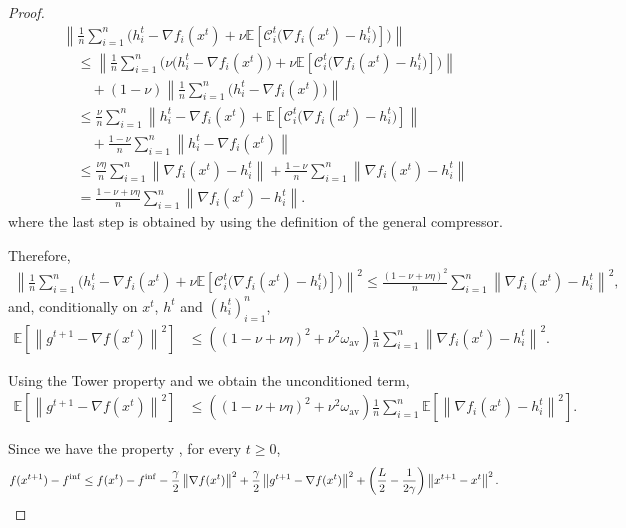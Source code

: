 \documentclass{article} %
\theoremstyle{plain}
\theoremstyle{definition}
\theoremstyle{remark}
\newcommand{\sqnorm}[1]{\left\| #1 \right\|^2}
\newcommand{\Exp}[1]{\mathbb{E}\!\left[ #1 \right]}
\newcommand{\oma}{\omega_{\mathrm{av}}}
\begin{document}
\begin{proof}
   \begin{align*}
      &\left\|\frac{1}{n}\sum_{i=1}^n \Big(h_i^{t}-\nabla f_i(x^t) +\nu \Exp{\mathcal{C}_i^t\big(\nabla f_i(x^t)-h_i^t\big)} \Big)\right\|\\
      &\quad \leq \left\|\frac{1}{n}\sum_{i=1}^n \Big(\nu\big(h_i^{t}-\nabla f_i(x^t)\big) +\nu \Exp{\mathcal{C}_i^t\big(\nabla f_i(x^t)-h_i^t\big)} \Big)\right\|\\
      &\quad\quad + (1-\nu)\left\|\frac{1}{n}\sum_{i=1}^n \big(h_i^{t}-\nabla f_i(x^t)\big)\right\|\\
      &\quad \leq \frac{\nu}{n}\sum_{i=1}^n\left\|h_i^{t}-\nabla f_i(x^t)+ \Exp{\mathcal{C}_i^t\big(\nabla f_i(x^t)-h_i^t\big)}\right\|\\
      &\quad\quad + \frac{1-\nu}{n}\sum_{i=1}^n \left\|h_i^{t}-\nabla f_i(x^t)\right\|\\
      &\quad \leq  \frac{\nu\eta}{n}\sum_{i=1}^n \left\|\nabla f_i(x^t)-h_i^{t}\right\|+ \frac{1-\nu}{n}\sum_{i=1}^n \left\|\nabla f_i(x^t)-h_i^{t}\right\|\\
      & \quad = \frac{1-\nu+\nu\eta}{n}\sum_{i=1}^n \left\|\nabla f_i(x^t)-h_i^{t}\right\|.
   \end{align*}
   where the last step is obtained by using the definition of the general compressor. 

   Therefore, 
   \begin{align*}
   \sqnorm{\frac{1}{n}\sum_{i=1}^n \Big(h_i^{t}-\nabla f_i(x^t) +\nu \Exp{\mathcal{C}_i^t\big(\nabla f_i(x^t)-h_i^t\big)} \Big)} \leq \frac{(1-\nu+\nu\eta)^2}{n}\sum_{i=1}^n \sqnorm{\nabla f_i(x^t)-h_i^{t}},
   \end{align*}
   and, 
   conditionally on $x^t$, $h^t$ and $(h_i^t)_{i=1}^n$,
   \begin{align*}
   \Exp{\sqnorm{g^{t+1}-\nabla f(x^t)}} &\leq 
   \left((1-\nu+\nu\eta)^2+\nu^2\oma\right)\frac{1}{n}\sum_{i=1}^n \sqnorm{\nabla f_i(x^t)-h_i^{t}}.
   \end{align*}

   Using the Tower property and we obtain the unconditioned term,
   \begin{align*}
      \Exp{\sqnorm{g^{t+1}-\nabla f(x^t)}} &\leq 
      \left((1-\nu+\nu\eta)^2+\nu^2\oma\right)\frac{1}{n}\sum_{i=1}^n \Exp{\sqnorm{\nabla f_i(x^t)-h_i^{t}}}.
      \end{align*}
    
   Since we have the property \citep[Lemma 4]{ric21}, for every $t\geq 0$,
   \begin{align}
   f(x^{t+1}) -f^{\inf} &\leq f(x^t)  -f^{\inf} -\frac{\gamma}{2} \sqnorm{\nabla f(x^t)} +\frac{ \gamma }{2}\sqnorm{g^{t+1}-\nabla f(x^t)} + \left(\frac{ L}{2}-\frac{1}{2\gamma}\right)\sqnorm{x^{t+1}-x^t}.\notag
   \end{align}


\end{proof}
\end{document}
